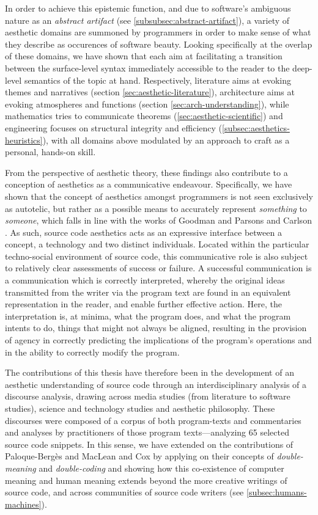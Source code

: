 In order to achieve this epistemic function, and due to software's ambiguous nature as an \emph{abstract artifact} (see \autoref{subsubsec:abstract-artifact}), a variety of aesthetic domains are summoned by programmers in order to make sense of what they describe as occurences of software beauty. Looking specifically at the overlap of these domains, we have shown that each aim at facilitating a transition between the surface-level syntax immediately accessible to the reader to the deep-level semantics of the topic at hand. Respectively, literature aims at evoking themes and narratives (section \autoref{sec:aesthetic-literature}), architecture aims at evoking atmospheres and functions (section \autoref{sec:arch-understanding}), while mathematics tries to communicate theorems (\autoref{sec:aesthetic-scientific}) and engineering focuses on structural integrity and efficiency (\autoref{subsec:aesthetics-heuristics}), with all domains above modulated by an approach to craft as a personal, hands-on skill.

From the perspective of aesthetic theory, these findings also contribute to a conception of aesthetics as a communicative endeavour. Specifically, we have shown that the concept of aesthetics amongst programmers is not seen exclusively as autotelic, but rather as a possible means to accurately represent \emph{something} to \emph{someone}, which falls in line with the works of Goodman and Parsons and Carlson \citep{goodman_languages_1976,parsons_functional_2012}. As such, source code aesthetics acts as an expressive interface between a concept, a technology and two distinct individuals. Located within the particular techno-social environment of source code, this communicative role is also subject to relatively clear assessments of success or failure. A successful communication is a communication which is correctly interpreted, whereby the original ideas transmitted from the writer via the program text are found in an equivalent representation in the reader, and enable further effective action. Here, the interpretation is, at minima, what the program does, and what the program intents to do, things that might not always be aligned, resulting in the provision of agency in correctly predicting the implications of the program's operations and in the ability to correctly modify the program.

The contributions of this thesis have therefore been in the development of an aesthetic understanding of source code through an interdisciplinary analysis of a discourse analysis, drawing across media studies (from literature to software studies), science and technology studies and aesthetic philosophy. These discourses were composed of a corpus of both program-texts and commentaries and analyses by practitioners of those program texts—analyzing 65  selected source code snippets. In this sense, we have extended on the contributions of Paloque-Bergès and MacLean and Cox by applying on their concepts of \emph{double-meaning}  and \emph{double-coding} and showing how this co-existence of computer meaning and human meaning extends beyond the more creative writings of source code, and across communities of source code writers (see \autoref{subsec:humans-machines}).

